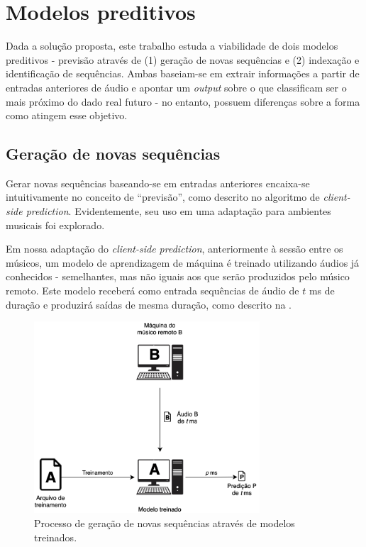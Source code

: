 \section{Modelos preditivos}

Dada a solução proposta, este trabalho estuda a viabilidade de dois modelos preditivos - previsão através de (1) geração de novas sequências e (2) indexação e identificação de sequências. Ambas baseiam-se em extrair informações a partir de entradas anteriores de áudio e apontar um \textit{output} sobre o que classificam ser o mais próximo do dado real futuro - no entanto, possuem diferenças sobre a forma como atingem esse objetivo.

\subsection{Geração de novas sequências}
\label{subsec:new_sequence_generator}

Gerar novas sequências baseando-se em entradas anteriores encaixa-se intuitivamente no conceito de ``previsão'', como descrito no algoritmo de \textit{client-side prediction}. Evidentemente, seu uso em uma adaptação para ambientes musicais foi explorado.

Em nossa adaptação do \textit{client-side prediction}, anteriormente à sessão entre os músicos, um modelo de aprendizagem de máquina é treinado utilizando áudios já conhecidos -  semelhantes, mas não iguais aos que serão produzidos pelo músico remoto. Este modelo receberá como entrada sequências de áudio de $t$ ms de duração e produzirá saídas de mesma duração, como descrito na .

\begin{figure}[htbp]
    \centering
    \includegraphics[width=0.75\textwidth]{images/prediction-model.png}
    \caption{Processo de geração de novas sequências através de modelos treinados.}
    \label{fig:generative_model}
\end{figure}


